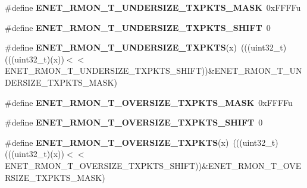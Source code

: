\begin{DoxyCompactItemize}
\item 
\#define {\bfseries E\+N\+E\+T\+\_\+\+R\+M\+O\+N\+\_\+\+T\+\_\+\+U\+N\+D\+E\+R\+S\+I\+Z\+E\+\_\+\+T\+X\+P\+K\+T\+S\+\_\+\+M\+A\+SK}~0x\+F\+F\+F\+Fu\hypertarget{group__ENET__Register__Masks_gac79ab5e21dda24e10c602a553f1096bb}{}\label{group__ENET__Register__Masks_gac79ab5e21dda24e10c602a553f1096bb}

\item 
\#define {\bfseries E\+N\+E\+T\+\_\+\+R\+M\+O\+N\+\_\+\+T\+\_\+\+U\+N\+D\+E\+R\+S\+I\+Z\+E\+\_\+\+T\+X\+P\+K\+T\+S\+\_\+\+S\+H\+I\+FT}~0\hypertarget{group__ENET__Register__Masks_ga1e9b9d2818563f7ddb3d266af3e5bbfd}{}\label{group__ENET__Register__Masks_ga1e9b9d2818563f7ddb3d266af3e5bbfd}

\item 
\#define {\bfseries E\+N\+E\+T\+\_\+\+R\+M\+O\+N\+\_\+\+T\+\_\+\+U\+N\+D\+E\+R\+S\+I\+Z\+E\+\_\+\+T\+X\+P\+K\+TS}(x)~(((uint32\+\_\+t)(((uint32\+\_\+t)(x))$<$$<$E\+N\+E\+T\+\_\+\+R\+M\+O\+N\+\_\+\+T\+\_\+\+U\+N\+D\+E\+R\+S\+I\+Z\+E\+\_\+\+T\+X\+P\+K\+T\+S\+\_\+\+S\+H\+I\+FT))\&E\+N\+E\+T\+\_\+\+R\+M\+O\+N\+\_\+\+T\+\_\+\+U\+N\+D\+E\+R\+S\+I\+Z\+E\+\_\+\+T\+X\+P\+K\+T\+S\+\_\+\+M\+A\+SK)\hypertarget{group__ENET__Register__Masks_ga90299d138525aced7aee63953319e8f4}{}\label{group__ENET__Register__Masks_ga90299d138525aced7aee63953319e8f4}

\item 
\#define {\bfseries E\+N\+E\+T\+\_\+\+R\+M\+O\+N\+\_\+\+T\+\_\+\+O\+V\+E\+R\+S\+I\+Z\+E\+\_\+\+T\+X\+P\+K\+T\+S\+\_\+\+M\+A\+SK}~0x\+F\+F\+F\+Fu\hypertarget{group__ENET__Register__Masks_gac24da13e75404927ddc2e7a9f1dc9134}{}\label{group__ENET__Register__Masks_gac24da13e75404927ddc2e7a9f1dc9134}

\item 
\#define {\bfseries E\+N\+E\+T\+\_\+\+R\+M\+O\+N\+\_\+\+T\+\_\+\+O\+V\+E\+R\+S\+I\+Z\+E\+\_\+\+T\+X\+P\+K\+T\+S\+\_\+\+S\+H\+I\+FT}~0\hypertarget{group__ENET__Register__Masks_gaa57896dafe9204df8f2d835281f03114}{}\label{group__ENET__Register__Masks_gaa57896dafe9204df8f2d835281f03114}

\item 
\#define {\bfseries E\+N\+E\+T\+\_\+\+R\+M\+O\+N\+\_\+\+T\+\_\+\+O\+V\+E\+R\+S\+I\+Z\+E\+\_\+\+T\+X\+P\+K\+TS}(x)~(((uint32\+\_\+t)(((uint32\+\_\+t)(x))$<$$<$E\+N\+E\+T\+\_\+\+R\+M\+O\+N\+\_\+\+T\+\_\+\+O\+V\+E\+R\+S\+I\+Z\+E\+\_\+\+T\+X\+P\+K\+T\+S\+\_\+\+S\+H\+I\+FT))\&E\+N\+E\+T\+\_\+\+R\+M\+O\+N\+\_\+\+T\+\_\+\+O\+V\+E\+R\+S\+I\+Z\+E\+\_\+\+T\+X\+P\+K\+T\+S\+\_\+\+M\+A\+SK)\hypertarget{group__ENET__Register__Masks_ga5e08d883d3486d606c248666912ac051}{}\label{group__ENET__Register__Masks_ga5e08d883d3486d606c248666912ac051}


\end{DoxyCompactItemize}
